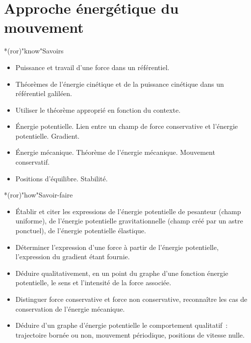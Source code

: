 \documentclass[../../main/main.tex]{subfiles}
\begin{document}
\setcounter{chapter}{3}

\chapter{Approche \'energ\'etique du mouvement}

\vspace*{\fill}

\begin{prgm}
	\begin{tcb}*(ror)"know"{Savoirs}
		\begin{itemize}
			\item Puissance et travail d'une force dans un référentiel.
			\item Théorèmes de l'énergie cinétique et de la puissance cinétique dans
			      un référentiel galiléen.
			\item Utiliser le théorème approprié en fonction du contexte.
			\item Énergie potentielle. Lien entre un champ de force conservative et
			      l'énergie potentielle. Gradient.
			\item Énergie mécanique. Théorème de l'énergie mécanique. Mouvement
			      conservatif.
			\item Positions d'équilibre. Stabilité.
		\end{itemize}
	\end{tcb}
	\begin{tcb}*(ror)"how"{Savoir-faire}
		\begin{itemize}
			\item Établir et citer les expressions de l'énergie potentielle de
			      pesanteur (champ uniforme), de l'énergie potentielle
			      gravitationnelle (champ créé par un astre ponctuel), de l'énergie
			      potentielle élastique.

			\item Déterminer l'expression d'une force à partir de l'énergie
			      potentielle, l'expression du gradient étant fournie.

			\item Déduire qualitativement, en un point du graphe d'une fonction
			      énergie potentielle, le sens et l'intensité de la force associée.

			\item Distinguer force conservative et force non conservative, reconnaître
			      les cas de conservation de l'énergie mécanique.

			\item Déduire d'un graphe d'énergie potentielle le comportement
			      qualitatif~: trajectoire bornée ou non, mouvement périodique,
			      positions de vitesse nulle.


\end{itemize}
\end{tcb}
\end{prgm}
\end{document}
